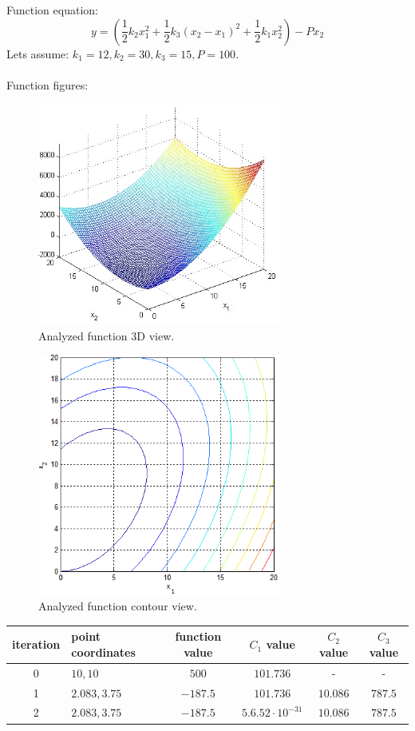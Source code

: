 \documentclass[12pt]{article}
\begin{document}
Function equation:
\begin{equation}
y=(\frac{1}{2}k_2x_1^2+\frac{1}{2}k_3(x_2-x_1)^2+\frac{1}{2}k_1x_2^2)-Px_2
\end{equation}
Lets assume:
$k_1=12, k_2=30, k_3=15, P=100$.
\\\\
Function figures:
\begin{figure}[H]
	\begin{center}
		\includegraphics[width=8cm]{springs_3D.jpg}
		\caption{Analyzed function 3D view.}
	\end{center}
\end{figure}
\begin{figure}[H]
	\begin{center}
		\includegraphics[width=8cm]{springs_cont.png}
		\caption{Analyzed function contour view.}
	\end{center}
\end{figure}

	\begin{table}[H]
		\begin{tabularx}{\textwidth}{c|X|c|c|c|c|}
			iteration & point coordinates & function value & $C_1$ value & $C_2$ value & $C_3$ value\\
			\hline
			0 & $10, 10$ & $500$ & $101.736$ & - & - \\
			\hline
			1 & $2.083, 3.75$ & $-187.5$ & $101.736$ & $10.086$ & $787.5$ \\
			\hline
			2 & $2.083, 3.75$ & $-187.5$ & $5.6.52\cdot10^{-31}$ & $10.086$ & $787.5$ \\
			\hline		
		\end{tabularx}	
	\end{table}
\end{document}
